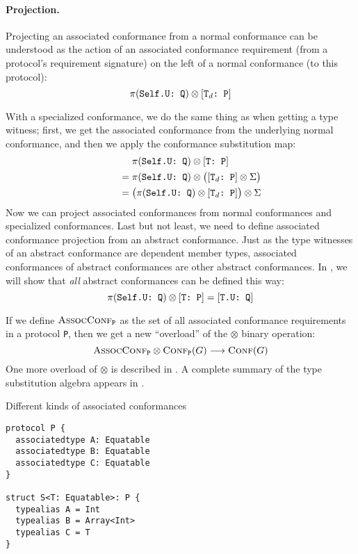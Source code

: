 \documentclass[../generics]{subfiles}
\begin{document}
\paragraph{Projection.}
Projecting an associated conformance from a normal conformance can be understood as the action of an associated conformance requirement (from a protocol's requirement signature) on the left of a normal conformance (to this protocol):
\[\pi(\texttt{Self.U:~Q}) \otimes [\texttt{$\texttt{T}_d$:~P}]\]

With a specialized conformance, we do the same thing as when getting a type witness; first, we get the associated conformance from the underlying normal conformance, and then we apply the conformance substitution map:
\begin{gather*}
\pi(\texttt{Self.U:~Q})\otimes[\texttt{T:~P}]\\
\qquad {} = \pi(\texttt{Self.U:~Q})\otimes\bigl([\texttt{$\texttt{T}_d$:~P}]\otimes\Sigma\bigr)\\
\qquad {} = \bigl(\pi(\texttt{Self.U:~Q})\otimes[\texttt{$\texttt{T}_d$:~P}]\bigr)\otimes\Sigma
\end{gather*}
Now we can project associated conformances from normal conformances and specialized conformances. Last but not least, we need to define associated conformance projection from an abstract conformance. Just as the type witnesses of an abstract conformance are dependent member types, associated conformances of abstract conformances are other abstract conformances. In , we will show that \emph{all} abstract conformances can be defined this way:
\[
\pi(\texttt{Self.U:~Q}) \otimes [\texttt{T:~P}] = [\texttt{T.U:~Q}]
\]

If we define $\textsc{AssocConf}_{\texttt{P}}$ as the set of all associated conformance requirements in a protocol \texttt{P}, then we get a new ``overload'' of the \index{$\otimes$}$\otimes$ binary operation:
\[\textsc{AssocConf}_{\texttt{P}}\otimes\textsc{Conf}_{\texttt{P}}({G})\longrightarrow\textsc{Conf}({G})\]
One more overload of $\otimes$ is described in . A complete summary of the type substitution algebra appears in .

\begin{listing}\caption{Different kinds of associated conformances}\label{associated conformance example}
\begin{Verbatim}
protocol P {
  associatedtype A: Equatable
  associatedtype B: Equatable
  associatedtype C: Equatable
}

struct S<T: Equatable>: P {
  typealias A = Int
  typealias B = Array<Int>
  typealias C = T
}
\end{Verbatim}
\end{listing}
\end{document}
